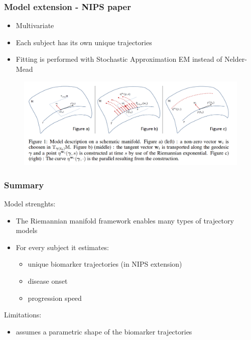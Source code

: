 \documentclass[10pt,xcolor=table]{beamer}
\begin{document}
\begin{frame}
\frametitle{Model extension - NIPS paper}

\begin{itemize}
 \item Multivariate
 \item Each subject has its own unique trajectories
 \item Fitting is performed with Stochastic Approximation EM instead of Nelder-Mead
\end{itemize}


\begin{figure}
\includegraphics[scale=0.25]{manifold_schiratti_nips.png}
\end{figure}

\end{frame}

\begin{frame}
\frametitle{Summary}

Model strenghts:
\begin{itemize}
 \item The Riemannian manifold framework enables many types of trajectory models
 \item For every subject it estimates:
 \begin{itemize}
  \item unique biomarker trajectories (in NIPS extension)
  \item disease onset
  \item progression speed
 \end{itemize}
\end{itemize}

Limitations:
\begin{itemize}
 \item assumes a parametric shape of the biomarker trajectories
\end{itemize}


\end{frame}

\fontsize{6pt}{7.2}\selectfont
{}
\end{document}
